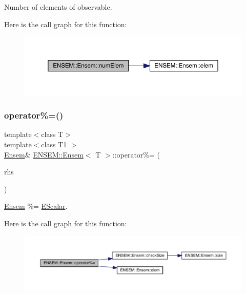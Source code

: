 Number of elements of observable. 

Here is the call graph for this function\+:
\nopagebreak
\begin{figure}[H]
\begin{center}
\leavevmode
\includegraphics[width=350pt]{d7/d3e/classENSEM_1_1Ensem_a495a563176192200eca2f16978158750_cgraph}
\end{center}
\end{figure}
\mbox{\label{classENSEM_1_1Ensem_a8f910ad50fa1625b535bd2456aa7ad64}} 
\subsubsection{\texorpdfstring{operator\%=()}{operator\%=()}\hspace{0.1cm}{\footnotesize\ttfamily [1/2]}}
{\footnotesize\ttfamily template$<$class T$>$ \\
template$<$class T1 $>$ \\
\mbox{\hyperlink{classENSEM_1_1Ensem}{Ensem}}\& \mbox{\hyperlink{classENSEM_1_1Ensem}{E\+N\+S\+E\+M\+::\+Ensem}}$<$ T $>$\+::operator\%= (\begin{DoxyParamCaption}\item[{const \mbox{\hyperlink{classENSEM_1_1EScalar}{E\+Scalar}}$<$ T1 $>$ \&}]{rhs }\end{DoxyParamCaption})\hspace{0.3cm}{\ttfamily [inline]}}



\mbox{\hyperlink{classENSEM_1_1Ensem}{Ensem}} \%= \mbox{\hyperlink{classENSEM_1_1EScalar}{E\+Scalar}}. 

Here is the call graph for this function\+:
\nopagebreak
\begin{figure}[H]
\begin{center}
\leavevmode
\includegraphics[width=350pt]{d7/d3e/classENSEM_1_1Ensem_a8f910ad50fa1625b535bd2456aa7ad64_cgraph}
\end{center}
\end{figure}
\mbox{\label{classENSEM_1_1Ensem_a8f910ad50fa1625b535bd2456aa7ad64}} 

